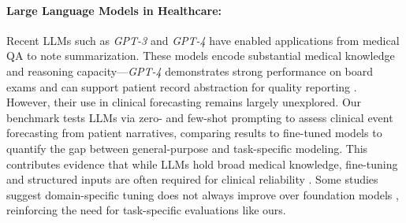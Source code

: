 \paragraph{Large Language Models in Healthcare:}
Recent LLMs such as \textit{GPT-3} and \textit{GPT-4} have enabled applications from medical QA to note summarization. These models encode substantial medical knowledge and reasoning capacity—\textit{GPT-4} demonstrates strong performance on board exams and can support patient record abstraction for quality reporting \citep{boussina2024large}. However, their use in clinical forecasting remains largely unexplored.
Our benchmark tests LLMs via zero- and few-shot prompting to assess clinical event forecasting from patient narratives, comparing results to fine-tuned models to quantify the gap between general-purpose and task-specific modeling. This contributes evidence that while LLMs hold broad medical knowledge, fine-tuning and structured inputs are often required for clinical reliability \citep{huang2019clinicalbert, gu2021domain}. Some studies suggest domain-specific tuning does not always improve over foundation models \citep{jeong2024medical}, reinforcing the need for task-specific evaluations like ours.




